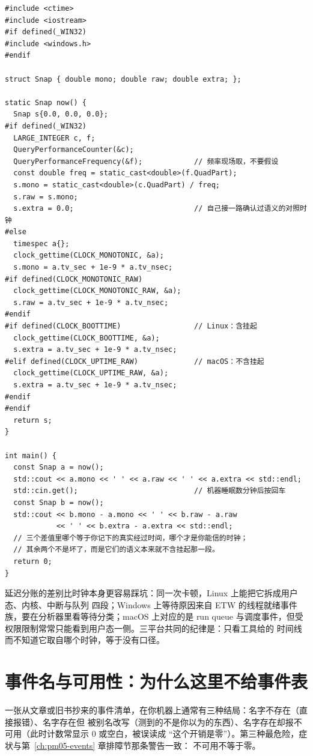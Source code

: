 \documentclass[12pt,a4paper,fontset=fandol]{ctexbook}
\begin{document}
\begin{lstlisting}[style=cppstyle, caption={睡眠或挂起前后各取一次快照，验证所选时钟是否代表真实经过时间（骨架，数值自己填）}, label={lst:pmapA-clock}]
#include <ctime>
#include <iostream>
#if defined(_WIN32)
#include <windows.h>
#endif

struct Snap { double mono; double raw; double extra; };

static Snap now() {
  Snap s{0.0, 0.0, 0.0};
#if defined(_WIN32)
  LARGE_INTEGER c, f;
  QueryPerformanceCounter(&c);
  QueryPerformanceFrequency(&f);            // 频率现场取，不要假设
  const double freq = static_cast<double>(f.QuadPart);
  s.mono = static_cast<double>(c.QuadPart) / freq;
  s.raw = s.mono;
  s.extra = 0.0;                            // 自己接一路确认过语义的对照时钟
#else
  timespec a{};
  clock_gettime(CLOCK_MONOTONIC, &a);
  s.mono = a.tv_sec + 1e-9 * a.tv_nsec;
#if defined(CLOCK_MONOTONIC_RAW)
  clock_gettime(CLOCK_MONOTONIC_RAW, &a);
  s.raw = a.tv_sec + 1e-9 * a.tv_nsec;
#endif
#if defined(CLOCK_BOOTTIME)                 // Linux：含挂起
  clock_gettime(CLOCK_BOOTTIME, &a);
  s.extra = a.tv_sec + 1e-9 * a.tv_nsec;
#elif defined(CLOCK_UPTIME_RAW)             // macOS：不含挂起
  clock_gettime(CLOCK_UPTIME_RAW, &a);
  s.extra = a.tv_sec + 1e-9 * a.tv_nsec;
#endif
#endif
  return s;
}

int main() {
  const Snap a = now();
  std::cout << a.mono << ' ' << a.raw << ' ' << a.extra << std::endl;
  std::cin.get();                           // 机器睡眠数分钟后按回车
  const Snap b = now();
  std::cout << b.mono - a.mono << ' ' << b.raw - a.raw
            << ' ' << b.extra - a.extra << std::endl;
  // 三个差值里哪个等于你记下的真实经过时间，哪个才是你能信的时钟；
  // 其余两个不是坏了，而是它们的语义本来就不含挂起那一段。
  return 0;
}
\end{lstlisting}

延迟分账的差别比时钟本身更容易踩坑：同一次卡顿，Linux 上能把它拆成用户态、内核、中断与队列
四段；Windows 上等待原因来自 ETW 的线程就绪事件族，要在分析器里看等待分类；macOS 上对应的是
run queue 与调度事件，但受权限限制常常只能看到用户态一侧。三平台共同的纪律是：只看工具给的
时间线而不知道它取自哪个时钟，等于没有口径。

\section{事件名与可用性：为什么这里不给事件表}

\begin{warning}[title={抄来的事件名是最常见的假结论来源}]
一张从文章或旧书抄来的事件清单，在你机器上通常有三种结局：名字不存在（直接报错）、名字存在但
被别名改写（测到的不是你以为的东西）、名字存在却报不可用（此时计数常显示 0 或空白，被误读成
``这个开销是零''）。第三种最危险，症状与第~\ref{ch:pm05-events} 章排障节那条警告一致：
不可用不等于零。
\end{warning}
\end{document}
